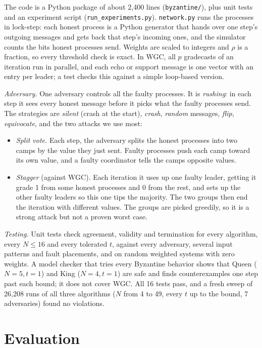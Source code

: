 \documentclass[conference]{IEEEtran}
\theoremstyle{definition}
\begin{document}
The code is a Python package of about 2{,}400 lines (\texttt{byzantine/}), plus unit tests and an experiment script (\texttt{run\_experiments.py}). \texttt{network.py} runs the processes in lock-step: each honest process is a Python generator that hands over one step's outgoing messages and gets back that step's incoming ones, and the simulator counts the bits honest processes send. Weights are scaled to integers and $\rho$ is a fraction, so every threshold check is exact. In WGC, all $p$ gradecasts of an iteration run in parallel, and each echo or support message is one vector with an entry per leader; a test checks this against a simple loop-based version.

\emph{Adversary.} One adversary controls all the faulty processes. It is \emph{rushing}: in each step it sees every honest message before it picks what the faulty processes send. The strategies are \emph{silent} (crash at the start), \emph{crash}, \emph{random} messages, \emph{flip}, \emph{equivocate}, and the two attacks we use most:
\begin{itemize}
\item \emph{Split vote.} Each step, the adversary splits the honest processes into two camps by the value they just sent. Faulty processes push each camp toward its own value, and a faulty coordinator tells the camps opposite values.
\item \emph{Stagger} (against WGC). Each iteration it uses up one faulty leader, getting it grade 1 from some honest processes and 0 from the rest, and sets up the other faulty leaders so this one tips the majority. The two groups then end the iteration with different values. The groups are picked greedily, so it is a strong attack but not a proven worst case.
\end{itemize}

\emph{Testing.} Unit tests check agreement, validity and termination for every algorithm, every $N\le16$ and every tolerated $t$, against every adversary, several input patterns and fault placements, and on random weighted systems with zero weights. A model checker that tries every Byzantine behavior shows that Queen ($N=5,t=1$) and King ($N=4,t=1$) are safe and finds counterexamples one step past each bound; it does not cover WGC. All 16 tests pass, and a fresh sweep of 26{,}208 runs of all three algorithms ($N$ from 4 to 49, every $t$ up to the bound, 7 adversaries) found no violations.

\section{Evaluation}\label{sec:eval}
\end{document}
